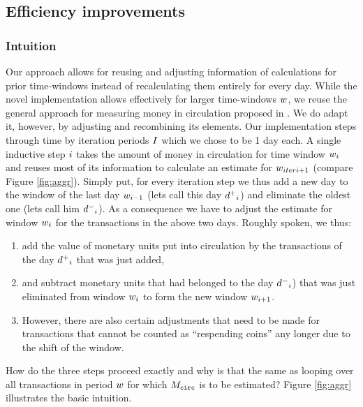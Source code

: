 \subsection{Efficiency improvements}
\label{sec:novel_impl}%

\subsubsection{Intuition}
\label{sec:novel_impl_intuition}%
Our approach allows for reusing and adjusting information of calculations for prior time-windows instead of recalculating them entirely for every day. %
While the novel implementation allows effectively for larger time-windows \({{w}}\), we reuse the general approach for measuring money in circulation proposed in \cite{pernice2019cryptocurrencies}. %
We do adapt it, however, by adjusting and recombining its elements. %
Our implementation steps through time by iteration periods \({I}\) which we chose to be 1 day each. %
A single inductive step \({i}\) takes the amount of money in circulation for time window \({w}_{i}\) and reuses most of its information to calculate an estimate for \({w}_{iteri+1}\) (compare Figure \ref{fig:aggr}). %
Simply put, for every iteration step we thus add a new day to the window of the last day \({w}_{{i}-1}\) (lets call this day \({d^{+}}_{{i}}\)) and eliminate the oldest one (lets call him \({d^{-}}_{{i}}\)). %
As a consequence we have to adjust the estimate for window \({w}_{i}\) for the transactions in the above two days. %
Roughly spoken, we thus:
\begin{enumerate}
\item add the value of monetary units put into circulation by the transactions of the day \({d^{+}}_{{i}}\) that was just added, %
\item and subtract monetary units that had belonged to the day \({d^{-}}_{{i}}\)) that was just eliminated from window \({w}_{{i}}\) to form the new window \({w}_{{i}+1}\). %
\item However, there are also certain adjustments that need to be made for transactions that cannot be counted as ``respending coins'' any longer due to the shift of the window. %
\end{enumerate}
How do the three steps proceed exactly and why is that the same as looping over all transactions in period \({w}\) for which \({M_{\mathtt{circ}}}\) is to be estimated?
Figure \ref{fig:aggr} illustrates the basic intuition. %

